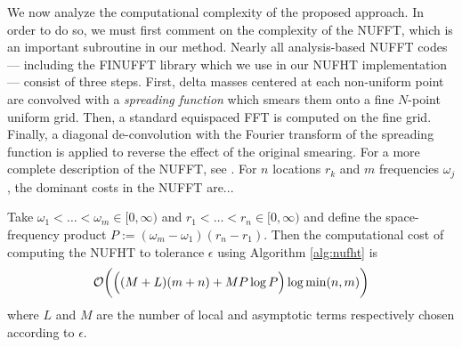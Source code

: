 We now analyze the computational complexity of the proposed approach. In order
to do so, we must first comment on the complexity of the NUFFT, which is an
important subroutine in our method. Nearly all analysis-based NUFFT codes ---
including the FINUFFT library \cite{barnett2019parallel} which we use in our
NUFHT implementation --- consist of three steps. First, delta masses centered at
each non-uniform point are convolved with a \textit{spreading function} which
smears them onto a fine $N$-point uniform grid. Then, a standard equispaced FFT
is computed on the fine grid. Finally, a diagonal de-convolution with the
Fourier transform of the spreading function is applied to reverse the effect of
the original smearing. For a more complete description of the NUFFT, see
\todocite. For $n$ locations $r_k$ and $m$ frequencies $\omega_j$, the dominant
costs in the NUFFT are... 

\begin{theorem}
    Take $\omega_1 < \dots < \omega_m \in [0,\infty)$ and $r_1 < \dots < r_n \in
    [0,\infty)$ and define the space-frequency product $P := (\omega_m -
    \omega_1)(r_n - r_1)$. Then the computational cost of computing the NUFHT to
    tolerance $\epsilon$ using Algorithm \ref{alg:nufht} is 
    $$\mathcal{O}\bigg(\Big((M + L)(m + n) + MP\log P\Big) \log \min(n,m) \bigg)$$ where
    $L$ and $M$ are the number of local and asymptotic terms respectively chosen
    according to $\epsilon$.
\end{theorem}


